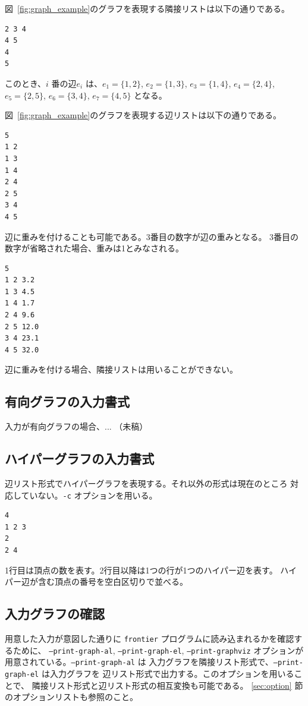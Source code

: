 \documentclass{jsarticle}
\begin{document}
図~\ref{fig:graph_example}のグラフを表現する隣接リストは以下の通りである。

\begin{verbatim}
2 3 4
4 5
4
5

\end{verbatim}

このとき、$i$ 番の辺$e_i$ は、$e_1 = \{1, 2\}$, $e_2 = \{1, 3\}$, $e_3 = \{1, 4\}$,
$e_4 = \{2, 4\}$, $e_5 = \{2, 5\}$, $e_6 = \{3, 4\}$, $e_7 = \{4, 5\}$ となる。

図~\ref{fig:graph_example}のグラフを表現する辺リストは以下の通りである。

\begin{verbatim}
5
1 2
1 3
1 4
2 4
2 5
3 4
4 5
\end{verbatim}

辺に重みを付けることも可能である。3番目の数字が辺の重みとなる。
3番目の数字が省略された場合、重みは1とみなされる。

\begin{verbatim}
5
1 2 3.2
1 3 4.5
1 4 1.7
2 4 9.6
2 5 12.0
3 4 23.1
4 5 32.0
\end{verbatim}

辺に重みを付ける場合、隣接リストは用いることができない。

\subsection{有向グラフの入力書式}

入力が有向グラフの場合、... （未稿）

\subsection{ハイパーグラフの入力書式}

辺リスト形式でハイパーグラフを表現する。それ以外の形式は現在のところ
対応していない。\texttt{-c} オプションを用いる。

\begin{verbatim}
4
1 2 3
2
2 4
\end{verbatim}

1行目は頂点の数を表す。2行目以降は1つの行が1つのハイパー辺を表す。
ハイパー辺が含む頂点の番号を空白区切りで並べる。

\subsection{入力グラフの確認}

用意した入力が意図した通りに \texttt{frontier} プログラムに読み込まれるかを確認するために、
\texttt{--print-graph-al}, \texttt{--print-graph-el},
\texttt{--print-graphviz} オプションが用意されている。\texttt{--print-graph-al} は
入力グラフを隣接リスト形式で、\texttt{--print-graph-el} は入力グラフを
辺リスト形式で出力する。このオプションを用いることで、
隣接リスト形式と辺リスト形式の相互変換も可能である。
\ref{sec:option} 節のオプションリストも参照のこと。
\end{document}
